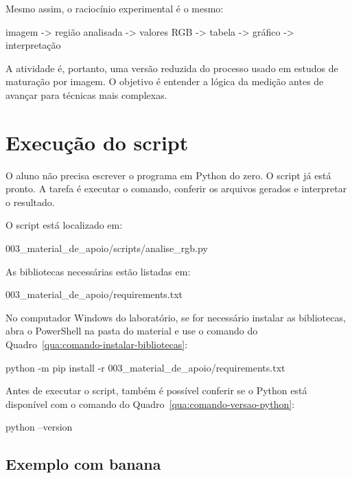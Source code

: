 \documentclass[12pt]{article}
\newcounter{quadro}
\begin{document}
Mesmo assim, o raciocínio experimental é o mesmo:

\begin{codebox}
imagem -> região analisada -> valores RGB
       -> tabela -> gráfico -> interpretação
\end{codebox}

A atividade é, portanto, uma versão reduzida do processo usado em estudos de maturação por imagem. O objetivo é entender a lógica da medição antes de avançar para técnicas mais complexas.

\section{Execução do script}

O aluno não precisa escrever o programa em Python do zero. O script já está pronto. A tarefa é executar o comando, conferir os arquivos gerados e interpretar o resultado.

O script está localizado em:

\begin{codebox}
003_material_de_apoio/scripts/analise_rgb.py
\end{codebox}

As bibliotecas necessárias estão listadas em:

\begin{codebox}
003_material_de_apoio/requirements.txt
\end{codebox}

No computador Windows do laboratório, se for necessário instalar as bibliotecas, abra o PowerShell na pasta do material e use o comando do Quadro~\ref{qua:comando-instalar-bibliotecas}:

\label{qua:comando-instalar-bibliotecas}
\begin{codebox}
python -m pip install -r 003_material_de_apoio/requirements.txt
\end{codebox}

Antes de executar o script, também é possível conferir se o Python está disponível com o comando do Quadro~\ref{qua:comando-versao-python}:

\label{qua:comando-versao-python}
\begin{codebox}
python --version
\end{codebox}

\subsection{Exemplo com banana}
\end{document}
